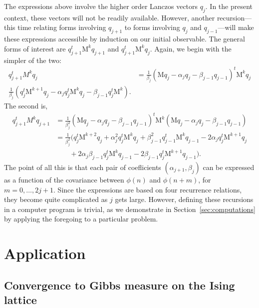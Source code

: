 \documentclass[12pt,letterpaper]{report}
\theoremstyle{plain}
\theoremstyle{definition}
\theoremstyle{remark}
\numberwithin{theorem}{chapter}
\numberwithin{claim}{chapter}
\numberwithin{equation}{chapter}
\numberwithin{conjecture}{chapter}
\newcommand\M{\ensuremath{\mathrm{M}}}
\newcommand\<{\ensuremath{\langle}}
\renewcommand\>{\ensuremath{\rangle}}
\begin{document}
The expressions above involve the higher order Lanczos vectors $q_j$. In the present context,
these vectors will not be readily available. However, another recursion---this time relating forms
involving $q_{j+1}$ to forms involving $q_j$ and $q_{j-1} $---will make these
expressions accessible by induction on our initial observable. The general forms
of interest are $q_{j+1}^t\M^k q_{j+1}$ and $q^t_{j+1}\M^k q_j$. Again, we 
begin with the simpler of the two:
\begin{align*}
  q_{j+1}^tM^kq_j &= 
 \frac{1}{\beta_j}(\M q_j - \alpha_j q_j - \beta_{j-1} q_{j-1})^t\M^k q_j\\
 \frac{1}{\beta_j}(q_j^t\M^{k+1} q_j - \alpha_j q_j^t\M^{k} q_j -\beta_{j-1} q_j^t\M^k).
\end{align*}
The second is,
\begin{align}
\label{eq:4.12}
  q_{j+1}^tM^kq_{j+1} 
&=  \frac{1}{\beta_j^2}(\M q_j - \alpha_j q_j - \beta_{j-1} q_{j-1})^t\M^k 
  (\M q_j - \alpha_j q_j - \beta_{j-1} q_{j-1})\nonumber\\
&=  \frac{1}{\beta_j^2}(q_j^t\M^{k+2} q_j + \alpha^2_jq_j^t\M^{k} q_j 
  + \beta^2_{j-1} q_{j-1}^t\M^k q_{j-1} - 2\alpha_jq_j^t\M^{k+1} q_j \nonumber\\
& \qquad    
    + 2\alpha_j \beta_{j-1}q_j^t\M^k q_{j-1}
    - 2\beta_{j-1}q_j^t \M^{k+1}q_{j-1}).
\end{align}
The point of all this is that each pair of coeﬂicients $(\alpha_{j+1}, \beta_j)$
can be expressed as a function of the covariance between 
$\phi(n)$ and $\phi(n+ m)$, for $m = 0, \dots, 2j+1$. Since the expressions
are based on four recurrence relations, they become quite complicated as $j$ gets large. However,
defining these recursions in a computer program is trivial, as we demonstrate
in Section~\ref{sec:computations} %
by applying the foregoing to a particular problem.
%
%
%
%





\part{Application\label{part:two}}%
\chapter{Convergence to Gibbs measure on the Ising lattice}
\label{cha:an-appl-conv}
\end{document}
